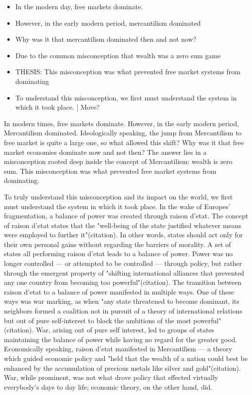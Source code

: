 \documentclass[letterpaper]{article}
\begin{document}
\begin{itemize}
\item In the modern day, free markets dominate.
\item However, in the early modern period, mercantilism dominated
\item Why was it that mercantilism dominated then and not now?
\item Due to the common misconception that wealth was a zero sum game
\item THESIS: This misconception was what prevented free market systems from
dominating
\item To understand this misconception, we first must understand the system
in which it took place. | Move?
\end{itemize}

In modern times, free markets dominate. However, in the early modern
period, Mercantilism dominated. Ideologically speaking, the jump from
Mercantilism to free market is quite a large one, so what allowed this
shift? Why was it that free market economies dominate now and not then?
The answer lies in a misconception rooted deep inside the concept of
Mercantilism: wealth is zero sum. This misconception was what prevented
free market systems from dominating.

To truly understand this misconception and its impact on the world, we
first must understand the system in which it took place. In the wake of
Europes' fragmentation, a balance of power was created through raison
d'etat. The concept of raison d'etat states that the "well-being of the
state justified whatever means were employed to further it"(citation).
In other words, states should act only for their own personal gains
without regarding the barriers of morality. A set of states all
performing raison d'etat leads to a balance of power. Power was no
longer controlled --- or attempted to be controlled --- through policy,
but rather through the emergent property of "shifting international
alliances that prevented any one country from becoming too
powerful"(citation). The transition between raison d'etat to a balance
of power manifested in multiple ways. One of these ways was war marking,
as when "any state threatened to become dominant, its neighbors formed a
coalition not in pursuit of a theory of international relations but out
of pure self-interest to block the ambitions of the most
powerful"(citation). War, arising out of pure self interest, led to
groups of states maintaining the balance of power while having no regard
for the greater good. Economically speaking, raison d'etat manifested in
Mercantilism --- a theory which guided economic policy and "held that
the wealth of a nation could best be enhanced by the accumulation of
precious metals like silver and gold"(citation). War, while prominent,
was not what drove policy that effected virtually everybody's days to
day life; economic theory, on the other hand, did.
\end{document}

